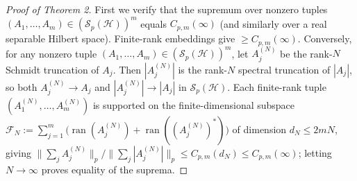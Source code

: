 \documentclass[10pt,letterpaper]{article}
\newcommand{\Hilb}{\mathcal{H}}
\newcommand{\Sp}{\mathcal{S}_p}
\newcommand{\ran}{\operatorname{ran}}
\begin{document}
\begin{proof}[Proof of Theorem 2]
First we verify that the supremum over nonzero tuples $(A_1,\dots,A_m) \in (\Sp(\Hilb))^m$ equals $C_{p,m}(\infty)$ (and similarly over a real separable Hilbert space). Finite-rank embeddings give $\ge C_{p,m}(\infty)$. Conversely, for any nonzero tuple $(A_1,\dots,A_m) \in (\Sp(\Hilb))^m$, let $A_j^{(N)}$ be the rank-$N$ Schmidt truncation of $A_j$. Then $|A_j^{(N)}|$ is the rank-$N$ spectral truncation of $|A_j|$, so both $A_j^{(N)} \to A_j$ and $|A_j^{(N)}| \to |A_j|$ in $\Sp(\Hilb)$. Each finite-rank tuple $(A_1^{(N)},\dots,A_m^{(N)})$ is supported on the finite-dimensional subspace $\mathcal{F}_N := \sum_{j=1}^m\bigl(\ran(A_j^{(N)}) + \ran((A_j^{(N)})^*)\bigr)$ of dimension $d_N \le 2mN$, giving $\|\sum_j A_j^{(N)}\|_p / \|\sum_j |A_j^{(N)}|\|_p \le C_{p,m}(d_N) \le C_{p,m}(\infty)$; letting $N \to \infty$ proves equality of the suprema.


\end{proof}
\end{document}
